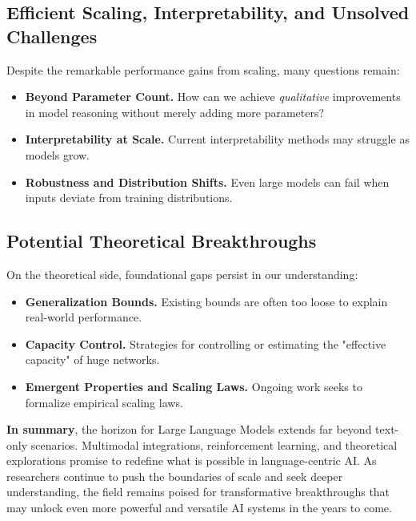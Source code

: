 \subsection{Efficient Scaling, Interpretability, and Unsolved Challenges}
\noindent
Despite the remarkable performance gains from scaling, many questions remain:
\begin{itemize}
    \item \textbf{Beyond Parameter Count.} How can we achieve \emph{qualitative} improvements in model reasoning without merely adding more parameters?
    \item \textbf{Interpretability at Scale.} Current interpretability methods may struggle as models grow.
    \item \textbf{Robustness and Distribution Shifts.} Even large models can fail when inputs deviate from training distributions.
\end{itemize}

\subsection{Potential Theoretical Breakthroughs}
\noindent
On the theoretical side, foundational gaps persist in our understanding:
\begin{itemize}
    \item \textbf{Generalization Bounds.} Existing bounds are often too loose to explain real-world performance.
    \item \textbf{Capacity Control.} Strategies for controlling or estimating the "effective capacity" of huge networks.
    \item \textbf{Emergent Properties and Scaling Laws.} Ongoing work seeks to formalize empirical scaling laws.
\end{itemize}

\noindent
\textbf{In summary}, the horizon for Large Language Models extends far beyond text-only scenarios. Multimodal integrations, reinforcement learning, and theoretical explorations promise to redefine what is possible in language-centric AI. As researchers continue to push the boundaries of scale and seek deeper understanding, the field remains poised for transformative breakthroughs that may unlock even more powerful and versatile AI systems in the years to come.
